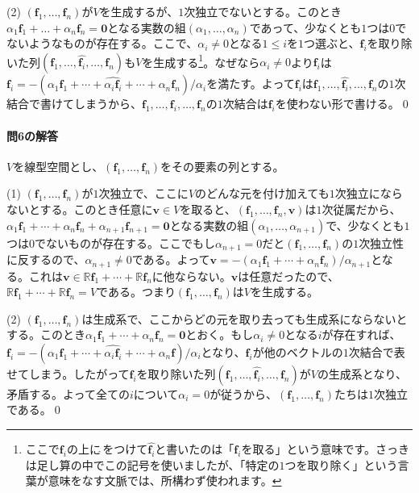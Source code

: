 \noindent (2) $(\bm{f}_1, \ldots, \bm{f}_n)$が$V$を生成するが、$1$次独立でないとする。このとき$\alpha_1 \bm{f}_1 + \ldots + \alpha_n \bm{f}_n = \bm{0}$となる実数の組$(\alpha_1, \ldots, \alpha_n)$であって、少なくとも$1$つは$0$でないようなものが存在する。ここで、$\alpha_i \neq 0$となる$1\leq i$を$1$つ選ぶと、$\bm{f}_i$を取り除いた列$(\bm{f}_1, \ldots, \hat{\bm{f}_i}, \ldots, \bm{f}_n)$も$V$を生成する\footnote{ここで$\bm{f}_i$の上に$\hat{\,}$をつけて$\hat{\bm{f}_i}$と書いたのは「$\bm{f}_i$を取る」という意味です。さっきは足し算の中でこの記号を使いましたが、「特定の$1$つを取り除く」という言葉が意味をなす文脈では、所構わず使われます。}。なぜなら$\alpha_i \neq 0$より$\bm{f}_i$は$\bm{f}_i = -(\alpha_1 \bm{f}_1 + \cdots + \hat{\alpha_i \bm{f}_i} + \cdots + \alpha_n \bm{f}_n)/\alpha_i$を満たす。よって$\bm{f}_i$は$\bm{f}_1,\ldots,\hat{\bm{f}_i},\ldots,\bm{f}_n$の$1$次結合で書けてしまうから、$\bm{f}_1,\ldots,\bm{f}_i,\ldots,\bm{f}_n$の$1$次結合は$\bm{f}_i$を使わない形で書ける。\qed

\paragraph{問6の解答} $V$を線型空間とし、$(\bm{f}_1, \ldots, \bm{f}_n)$をその要素の列とする。

\noindent (1) $(\bm{f}_1, \ldots, \bm{f}_n)$が$1$次独立で、ここに$V$のどんな元を付け加えても$1$次独立にならないとする。このとき任意に$\bm{v}\in V$を取ると、$(\bm{f}_1, \ldots, \bm{f}_n, \bm{v})$は$1$次従属だから、$\alpha_1 \bm{f}_1 + \cdots + \alpha_n \bm{f}_n + \alpha_{n + 1} \bm{f}_{n + 1} = \bm{0}$となる実数の組$(\alpha_1, \ldots, \alpha_{n + 1})$で、少なくとも$1$つは$0$でないものが存在する。ここでもし$\alpha_{n + 1} = 0$だと$(\bm{f}_1, \ldots, \bm{f}_n)$の$1$次独立性に反するので、$\alpha_{n + 1} \neq 0$である。よって$\bm{v} = -(\alpha_1 \bm{f}_1 + \cdots + \alpha_n \bm{f}_n)/\alpha_{n + 1}$となる。これは$\bm{v} \in \mathbb{R}\bm{f}_1 + \cdots + \mathbb{R}\bm{f}_n$に他ならない。$\bm{v}$は任意だったので、$\mathbb{R}\bm{f}_1 + \cdots + \mathbb{R}\bm{f}_n = V$である。つまり$(\bm{f}_1, \ldots, \bm{f}_n)$は$V$を生成する。

\noindent (2) $(\bm{f}_1, \ldots, \bm{f}_n)$は生成系で、ここからどの元を取り去っても生成系にならないとする。このとき$\alpha_1 \bm{f}_1 + \cdots + \alpha_n \bm{f}_n = \bm{0}$とおく。もし$\alpha_i \neq 0$となる$i$が存在すれば、$\bm{f}_i = -(\alpha_1 \bm{f}_1 + \cdots + \hat{\alpha_i \bm{f}_i} + \cdots + \alpha_n \bm{f})/\alpha_i$となり、$\bm{f}_i$が他のベクトルの$1$次結合で表せてしまう。したがって$\bm{f}_i$を取り除いた列$(\bm{f}_1, \ldots, \hat{\bm{f}_i}, \ldots ,\bm{f}_n)$が$V$の生成系となり、矛盾する。よって全ての$i$について$\alpha_i = 0$が従うから、$(\bm{f}_1, \ldots, \bm{f}_n)$たちは$1$次独立である。\qed


